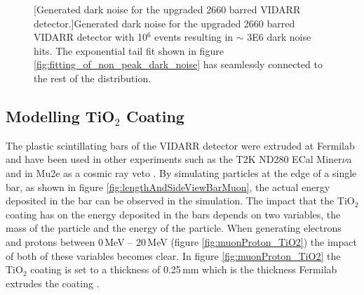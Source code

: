 \begin{figure}[!h]
\begin{minipage}{.45\textwidth}
  [Generated dark noise for the upgraded 2660 barred VIDARR detector.]{Generated dark noise for the upgraded 2660 barred VIDARR detector with 10$^6$ events resulting in $\sim$ 3E6 dark noise hits. The exponential tail fit shown in figure \ref{fig:fitting_of_non_peak_dark_noise} has seamlessly connected to the rest of the distribution.}
  \label{fig:individualDarkNoiseOld}
\end{minipage}
\end{figure}

\subsection{Modelling TiO$_2$ Coating}
The plastic scintillating bars of the VIDARR detector were extruded at Fermilab and have been used in other experiments such as the T2K ND280 ECal \cite{Allan_2013} Miner$\nu$a \cite{aliaga2014design} and in Mu2e as a cosmic ray veto \cite{Pla-Dalmau2014}. By simulating particles at the edge of a single bar, as shown in figure \ref{fig:lengthAndSideViewBarMuon}, the actual energy deposited in the bar can be observed in the simulation. The impact that the TiO$_2$ coating has on the energy deposited in the bars depends on two variables, the mass of the particle and the energy of the particle. When generating electrons and protons between 0\,MeV -- 20\,MeV (figure \ref{fig:muonProton_TiO2}) the impact of both of these variables becomes clear. In figure \ref{fig:muonProton_TiO2} the TiO$_2$ coating is set to a thickness of 0.25\,mm which is the thickness Fermilab extrudes the coating \cite{Pla-Dalmau2014}.

